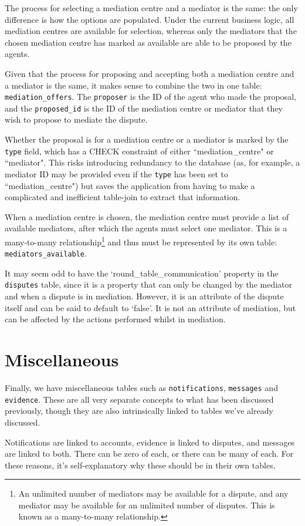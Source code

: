 The process for selecting a mediation centre and a mediator is the same: the only difference is how the options are populated. Under the current business logic, all mediation centres are available for selection, whereas only the mediators that the chosen mediation centre has marked as available are able to be proposed by the agents.

Given that the process for proposing and accepting both a mediation centre and a mediator is the same, it makes sense to combine the two in one table: \lstinline{mediation_offers}. The \lstinline{proposer} is the ID of the agent who made the proposal, and the \lstinline{proposed_id} is the ID of the mediation centre or mediator that they wish to propose to mediate the dispute.

Whether the proposal is for a mediation centre or a mediator is marked by the \lstinline{type} field, which has a CHECK constraint of either ``mediation\_centre" or ``mediator". This risks introducing redundancy to the database (as, for example, a mediator ID may be provided even if the \lstinline{type} has been set to ``mediation\_centre") but saves the application from having to make a complicated and inefficient table-join to extract that information.

When a mediation centre is chosen, the mediation centre must provide a list of available mediators, after which the agents must select one mediator. This is a many-to-many relationship\footnote{An unlimited number of mediators may be available for a dispute, and any mediator may be available for an unlimited number of disputes. This is known as a many-to-many relationship.} and thus must be represented by its own table: \lstinline{mediators_available}.

It may seem odd to have the `round\_table\_communication' property in the \lstinline{disputes} table, since it is a property that can only be changed by the mediator and when a dispute is in mediation. However, it is an attribute of the dispute itself and can be said to default to `false'. It is not an attribute of mediation, but can be affected by the actions performed whilst in mediation.

\section{Miscellaneous}

Finally, we have miscellaneous tables such as \lstinline{notifications}, \lstinline{messages} and \lstinline{evidence}. These are all very separate concepts to what has been discussed previously, though they are also intrinsically linked to tables we've already discussed.

Notifications are linked to accounts, evidence is linked to disputes, and messages are linked to both. There can be zero of each, or there can be many of each. For these reasons, it's self-explanatory why these should be in their own tables.
